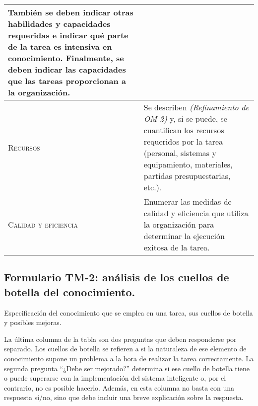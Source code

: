 \documentclass[12pt,a4paper,twoside,spanish]{article}      %
\begin{document}
\begin{table}[H]
\begin{tabularx}{\textwidth}{|l|X|}
También se deben indicar otras habilidades y capacidades
requeridas e indicar qué parte de la tarea es intensiva en
conocimiento. Finalmente, se deben indicar las capacidades
que las tareas proporcionan a la organización. \\ \hline
\textsc{Recursos} &
Se describen \emph{(Refinamiento de OM-2)} y, si se puede, se cuantifican los recursos
requeridos por la tarea (personal, sistemas y equipamiento,
materiales, partidas presupuestarias, etc.). \\ \hline
\textsc{Calidad y eficiencia} &
Enumerar las medidas de calidad y eficiencia que utiliza la
organización para determinar la ejecución exitosa de la
tarea.
\\ \hline
\end{tabularx}

  \label{tab.TM1}
\end{table}



\pagebreak
\subsection{Formulario TM-2: análisis de los cuellos de botella del conocimiento.}

{\color{blue} Especificación del conocimiento que se emplea en una tarea, sus cuellos de botella y posibles mejoras. 

La última columna de la tabla son dos preguntas que deben responderse por separado. Los cuellos de botella se refieren a si la naturaleza de ese elemento de conocimiento supone un problema a la hora de realizar la tarea correctamente. La segunda pregunta ``¿Debe ser mejorado?'' determina si ese cuello de botella tiene o puede superarse con la implementación del sistema inteligente o, por el contrario, no es posible hacerlo. Además, en esta columna no basta con una respuesta sí/no, sino que debe incluir una breve explicación sobre la respuesta. }
\end{document}
